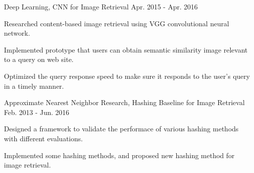 

\begin{cventries}

  \cventry
    {Deep Learning, \href{https://github.com/willard-yuan/CNN-for-Image-Retrieval}{\color{blue}{Code}}} %
    {CNN for Image Retrieval} %
    {} %
    {Apr. 2015 - Apr. 2016} %
    {
      \begin{cvitems} %
        \item {Researched content-based image retrieval using VGG convolutional neural network.}
        \item {Implemented prototype that users can obtain semantic similarity image relevant to a query on web site.}
        \item {Optimized the query response speed to make sure it responds to the user’s query in a timely manner.}
      \end{cvitems}
    }

  \cventry
    {Approximate Nearest Neighbor Research, \href{https://github.com/willard-yuan/hashing-baseline-for-image-retrieval}{\color{blue}{Code}}} %
    {Hashing Baseline for Image Retrieval} %
    {} %
    {Feb. 2013 - Jun. 2016} %
    {
      \begin{cvitems} %
        \item {Designed a framework to validate the performace of various hashing methods with different evaluations.}
        \item {Implemented some hashing methods, and proposed new hashing method for image retrieval.}
      \end{cvitems}
    }


\end{cventries}
